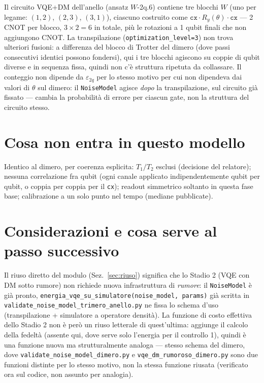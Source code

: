 \documentclass[11pt,a4paper]{article}
\begin{document}
Il circuito VQE+DM dell'anello (ansatz $W$-2q.6) contiene tre blocchi
$W$ (uno per legame: $(1,2)$, $(2,3)$, $(3,1)$), ciascuno costruito come
$\texttt{cx}\cdot R_y(\theta)\cdot\texttt{cx}$ --- 2 CNOT per blocco,
$3\times2=6$ in totale, più le rotazioni a 1 qubit finali che non
aggiungono CNOT. La transpilazione (\texttt{optimization\_level=3}) non
trova ulteriori fusioni: a differenza del blocco di Trotter del dimero
(dove passi consecutivi identici possono fondersi), qui i tre blocchi
agiscono su coppie di qubit diverse e in sequenza fissa, quindi non c'è
struttura ripetuta da collassare. Il conteggio non dipende da
$\varepsilon_{2q}$ per lo stesso motivo per cui non dipendeva dai valori
di $\theta$ sul dimero: il \texttt{NoiseModel} agisce \emph{dopo} la
transpilazione, sul circuito già fissato --- cambia la probabilità di
errore per ciascun gate, non la struttura del circuito stesso.

\section{Cosa non entra in questo modello}

Identico al dimero, per coerenza esplicita: $T_1/T_2$ esclusi
(decisione del relatore); nessuna correlazione fra qubit (ogni canale
applicato indipendentemente qubit per qubit, o coppia per coppia per il
\texttt{cx}); readout simmetrico soltanto in questa fase base;
calibrazione a un solo punto nel tempo (mediane pubblicate).

\section{Considerazioni e cosa serve al passo successivo}

Il riuso diretto del modulo (Sez.~\ref{sec:riuso}) significa che lo
Stadio 2 (VQE con DM sotto rumore) non richiede nuova infrastruttura di
\emph{rumore}: il \texttt{NoiseModel} è già pronto,
\texttt{energia\_vqe\_su\_simulatore(noise\_model, params)} già scritta
in \texttt{validate\_noise\_model\_trimero\_anello.py} ne fissa lo schema
d'uso (transpilazione + simulatore a operatore densità). La funzione di
costo effettiva dello Stadio 2 non è però un riuso letterale di
quest'ultima: aggiunge il calcolo della fedeltà (assente qui, dove serve
solo l'energia per il controllo 1), quindi è una funzione nuova ma
strutturalmente analoga --- stesso schema del dimero, dove
\texttt{validate\_noise\_model\_dimero.py} e
\texttt{vqe\_dm\_rumoroso\_dimero.py} sono due funzioni distinte per lo
stesso motivo, non la stessa funzione riusata (verificato ora sul
codice, non assunto per analogia).
\end{document}
